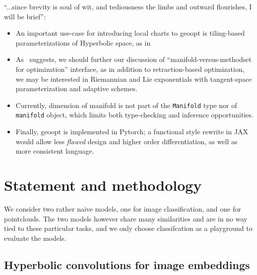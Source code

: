 ``...since brevity is soul of wit, and tediousness the limbs and outward
flourishes, I will be brief'':
\begin{itemize}
\item An important use-case for introducing local charts to geoopt is tiling-based
parameterizations of Hyperbolic space, as in~\citet{yaSaTilingBased}
\item As~\citet{trivializations} suggests, we should further our discussion of
``manifold-versus-methodset for optimization'' interface, as in addition to
retraction-based optimization, we may be interested in Riemannian and Lie
exponentials with tangent-space parameterization and adaptive schemes.
\item Currently, dimension of manifold is not part of the \texttt{Manifold}
type nor of \texttt{manifold} object, which limits both type-checking and
inference opportunities.
\item Finally, geoopt is implemented in Pytorch; a functional style rewrite in
JAX would allow less \emph{flawed} design and higher order differentiation, as
well as more consistent language.
\end{itemize}

\section{Statement and methodology} \label{sec:statement}

We consider two rather naive models, one for image classification, and one for
pointclouds. The two models however share many similarities and are in no way
tied to these particular tasks, and we only choose classifcation as a
playground to evaluate the models.

\subsection{Hyperbolic convolutions for image embeddings} \label{sec:hconv}

